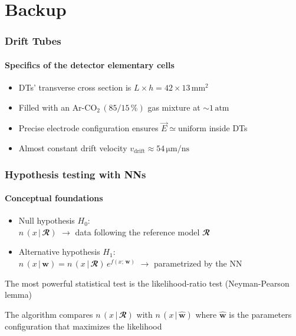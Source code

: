 \documentclass{beamer}
\begin{document}
	\section{Backup}


	\begin{frame}
		\frametitle{Drift Tubes}
		\framesubtitle{Specifics of the detector elementary cells}
		\begin{itemize}
			\item DTs' transverse cross section  is \alert{$L\times h = 42 \times 13 \,\si{\mm}^2$}
			\item Filled with an \alert{$\text{Ar-CO}_2\,(85/15\,\%)$} gas mixture at $\sim 1\,\text{atm}$
			\item Precise electrode configuration ensures \alert{$\vec{E}\simeq \text{uniform}$} inside DTs
			\item Almost \alert{constant drift velocity} $v_{\text{drift}}\approx 54\,\si{\um/\ns}$
		\end{itemize}
		\begin{center}
				
		\end{center}
	\end{frame}



	\begin{frame}
		\frametitle{Hypothesis testing with NNs}
		\framesubtitle{Conceptual foundations}

		\begin{itemize}
			\setlength{\itemsep}{0.6em}
			\item Null hypothesis $H_0$: \\\vspace{0.2em} 
			$n\,(x\,|\,\mathbfcal{R})$ $\longrightarrow$ data following
			the reference model $\mathbfcal{R}$
			\item Alternative hypothesis $H_1$: \\\vspace{0.2em} 
			$n\,(x\,|\,\bm{w}) =
			n\,(x\,|\,\mathbfcal{R})\,e^{f(x;\,\bm{w})}$ $\longrightarrow$ parametrized by the NN
		\end{itemize}

		\vfill

		The most powerful statistical test is the \alert{likelihood-ratio test} (Neyman-Pearson lemma)

		\vfill

		The algorithm compares $n\,(x\,|\,\mathbfcal{R})$ with $n\,(x\,|\,\bm{\widehat{w}})$ where $\bm{\widehat{w}}$ is
		the parameters configuration that maximizes the likelihood


	\end{frame}
\end{document}
